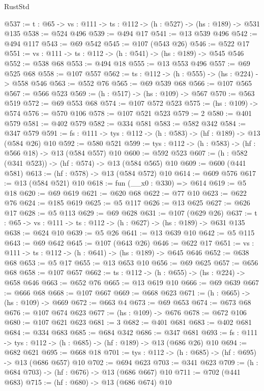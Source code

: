 \begin{lexlean}{RustStd}
\begin{coremodule}
@537 := {t : @65} -> {vs : @111} -> {ts : @112} -> (h : @527) -> (hs : @189) -> @531 @135
@538 := @524 @496
@539 := @494 @17
@541 := @13 @539 @496
@542 := @494 @117
@543 := @69 @542
@545 := @107 (@543 @26)
@546 := @522 @17
@551 := {vs : @111} -> {ts : @112} -> (h : @541) -> (hs : @189) -> @545 @546
@552 := @538 @68
@553 := @494 @18
@555 := @13 @553 @496
@557 := @69 @525 @68
@558 := @107 @557
@562 := {ts : @112} -> (h : @555) -> (hs : @224) -> @558 @546
@563 := @552 @76
@565 := @69 @539 @68
@566 := @107 @565
@567 := @566 @523
@569 := (h : @517) -> (hs : @109) -> @567
@570 := @563 @519
@572 := @69 @553 @68
@574 := @107 @572 @523
@575 := (hs : @109) -> @574
@576 := @570 @106
@578 := @107 @521 @523
@579 := 2
@580 := @401 @579
@581 := @402 @579
@582 := @334 @581
@583 := @582 @342
@584 := @347 @579
@591 := {fs : @111} -> {tys : @112} -> (h : @583) -> (hf : @189) -> @13 (@584 @26) @10
@592 := @580 @521
@599 := {tys : @112} -> (h : @583) -> (hf : @566 @18) -> @13 (@584 @557) @10
@600 := @592 @523
@607 := (h : @582 (@341 @523)) -> (hf : @574) -> @13 (@584 @565) @10
@609 := @600 (@441 @581)
@613 := (hf : @578) -> @13 (@584 @572) @10
@614 := @609 @576
@617 := @13 (@584 @521) @10
@618 := fun (__x0 : @330) => @614
@619 := @5 @18
@620 := @69 @619
@621 := @620 @68
@622 := @77 @10
@623 := @622 @76
@624 := @185 @619
@625 := @5 @117
@626 := @13 @625
@627 := @626 @17
@628 := @5 @113
@629 := @69 @628
@631 := @107 (@629 @26)
@637 := {t : @65} -> {vs : @111} -> {ts : @112} -> (h : @627) -> (hs : @189) -> @631 @135
@638 := @624 @10
@639 := @5 @26
@641 := @13 @639 @10
@642 := @5 @115
@643 := @69 @642
@645 := @107 (@643 @26)
@646 := @622 @17
@651 := {vs : @111} -> {ts : @112} -> (h : @641) -> (hs : @189) -> @645 @646
@652 := @638 @68
@653 := @5 @17
@655 := @13 @653 @10
@656 := @69 @625
@657 := @656 @68
@658 := @107 @657
@662 := {ts : @112} -> (h : @655) -> (hs : @224) -> @658 @646
@663 := @652 @76
@665 := @13 @619 @10
@666 := @69 @639
@667 := @666 @68
@668 := @107 @667
@669 := @668 @623
@671 := (h : @665) -> (hs : @109) -> @669
@672 := @663 @4
@673 := @69 @653
@674 := @673 @68
@676 := @107 @674 @623
@677 := (hs : @109) -> @676
@678 := @672 @106
@680 := @107 @621 @623
@681 := 3
@682 := @401 @681
@683 := @402 @681
@684 := @334 @683
@685 := @684 @342
@686 := @347 @681
@693 := {fs : @111} -> {tys : @112} -> (h : @685) -> (hf : @189) -> @13 (@686 @26) @10
@694 := @682 @621
@695 := @668 @18
@701 := {tys : @112} -> (h : @685) -> (hf : @695) -> @13 (@686 @657) @10
@702 := @694 @623
@703 := @341 @623
@709 := (h : @684 @703) -> (hf : @676) -> @13 (@686 @667) @10
@711 := @702 (@441 @683)
@715 := (hf : @680) -> @13 (@686 @674) @10

\end{coremodule}
\end{lexlean}

